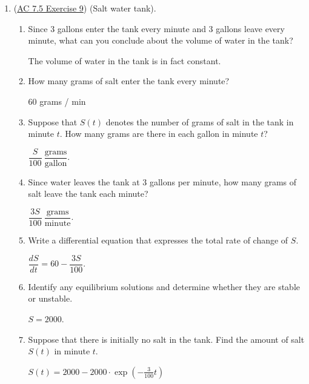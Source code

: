 \begin{enumerate}[leftmargin=0pt]
\begin{enumerate}
\begin{red}
        Or, if $W(1) = 10$ (more realistic), then $k = 18$, $W(t) = \sqrt{36t+64}$, and $W(12) \approx 22.27$.
    \end{red}


\end{enumerate}


\item (\href{https://faculty.gvsu.edu/boelkinm/Home/ACS/sec-7-5-modeling.html#jmX}{AC 7.5 Exercise 9}) (Salt water tank).
\begin{enumerate}
    \item Since 3 gallons enter the tank every minute and 3 gallons leave every minute, what can you conclude about the volume of water in the tank?

    \begin{red}
        The volume of water in the tank is in fact constant.
    \end{red}
    \item How many grams of salt enter the tank every minute? \begin{red}
        $60$ grams / min
    \end{red}
    \item Suppose that $S(t)$ denotes the number of grams of salt in the tank in minute $t$. How many grams are there in each gallon in minute $t$?
    \begin{red}
        $\dfrac{S}{100}\ \dfrac{\text{grams}}{\text{gallon}}.$
    \end{red}
    \item Since water leaves the tank at 3 gallons per minute, how many grams of salt leave the tank each minute?
    \begin{red}
        $\dfrac{3S}{100}\ \dfrac{\text{grams}}{\text{minute}}.$
    \end{red}
    \item Write a differential equation that expresses the total rate of change of $S$. \begin{red}
        $\dfrac{dS}{dt} = 60 - \dfrac{3S}{100}.$
    \end{red}
    \item Identify any equilibrium solutions and determine whether they are stable or unstable.
    
    \begin{red}
        $S = 2000$.
    \end{red}
    \item Suppose that there is initially no salt in the tank. Find the amount of salt $S(t)$ in minute $t$.
    \begin{red}
        $S(t) = 2000 - 2000\cdot \exp\left(-\tfrac{3}{100}t\right)$
    \end{red}
\end{enumerate}

\end{enumerate}

